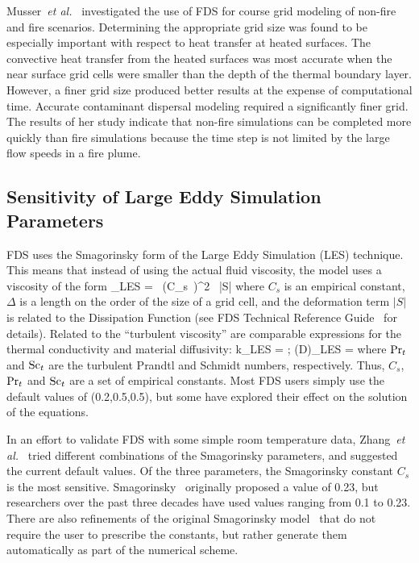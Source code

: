 \documentclass[11pt]{book}
\begin{document}
Musser~{\em et  al.}~\cite{Musser:1} investigated  the use of  FDS for course grid  modeling of non-fire and fire  scenarios. Determining the
appropriate  grid  size was  found  to  be  especially important  with respect  to heat  transfer  at heated  surfaces.  The convective  heat
transfer  from the  heated surfaces  was most  accurate when  the near surface grid cells were smaller than the depth of the thermal boundary layer.
However, a  finer grid  size  produced better  results at  the expense of computational time. Accurate contaminant dispersal modeling required a
significantly finer grid. The results of her study indicate that  non-fire simulations  can be  completed more  quickly  than fire simulations
because  the time  step is not  limited by the  large flow speeds in a fire plume.


\subsection{Sensitivity of Large Eddy Simulation Parameters}

FDS  uses the  Smagorinsky form  of  the Large  Eddy Simulation  (LES) technique.  This  means  that   instead  of  using  the  actual  fluid
viscosity, the model uses a viscosity of the form
\be
  \mu_{\hbox{\tiny LES}} =  \rho \,  (C_s\, \Delta)^2  \, |S|
\ee
where $C_s$  is an empirical constant, $\Delta$ is a length on the order of the size of a grid  cell,  and  the  deformation   term  $|S|$  is  related  to  the Dissipation Function (see FDS Technical Reference Guide~\cite{FDS_Tech_Guide_5} for details). Related to the ``turbulent  viscosity'' are  comparable
expressions  for  the thermal conductivity  and  material diffusivity:  \be  k_{\hbox{\tiny LES}}  = 
\quad   ;  \quad  (\rho D)_{\hbox{\tiny  LES}}  =  \ee  where $\hbox{Pr}_t$ and $\hbox{Sc}_t$ are the turbulent Prandtl and Schmidt numbers, respectively.  Thus, $C_s$, $\hbox{Pr}_t$  and $\hbox{Sc}_t$ are  a set  of  empirical constants.  Most  FDS users
simply use  the default values  of (0.2,0.5,0.5), but some have  explored their effect on the solution of the equations.

In an effort  to validate FDS with some  simple room temperature data, Zhang~{\em et al.}~\cite{Zhang:2}  tried different combinations of the
Smagorinsky parameters,  and suggested the current  default values. Of the  three parameters,  the  Smagorinsky constant  $C_s$  is the  most
sensitive.   Smagorinsky~\cite{Smagorinsky:1}  originally  proposed  a value of 0.23,  but researchers over the past  three decades have used values
ranging  from 0.1  to 0.23. There  are also refinements  of the original  Smagorinsky  model~\cite{Deardorff:1,Germano:1,Lilly:1} that do  not
require the  user  to  prescribe  the constants,  but  rather generate them automatically as part of the numerical scheme.
\end{document}
